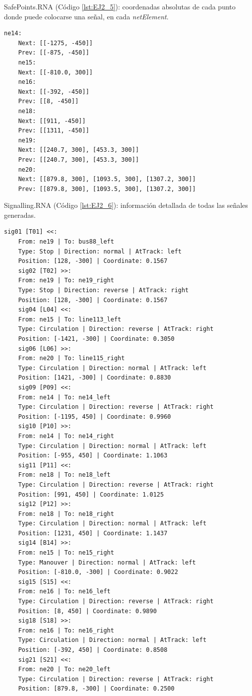 	SafePoints.RNA (Código \ref{lst:EJ2_5}): coordenadas absolutas de cada punto donde puede colocarse una señal, en cada \textit{netElement}.

	\begin{lstlisting}[language = {}, caption = SafePoints.RNA, label = {lst:EJ2_5}]
	ne14:
	Next: [[-1275, -450]]
	Prev: [[-875, -450]]
	ne15:
	Next: [[-810.0, 300]]
	ne16:
	Next: [[-392, -450]]
	Prev: [[8, -450]]
	ne18:
	Next: [[911, -450]]
	Prev: [[1311, -450]]
	ne19:
	Next: [[240.7, 300], [453.3, 300]]
	Prev: [[240.7, 300], [453.3, 300]]
	ne20:
	Next: [[879.8, 300], [1093.5, 300], [1307.2, 300]]
	Prev: [[879.8, 300], [1093.5, 300], [1307.2, 300]]
	\end{lstlisting}

	Signalling.RNA (Código \ref{lst:EJ2_6}): información detallada de todas las señales generadas.

	\begin{lstlisting}[language = {}, caption = Signalling.RNA, label = {lst:EJ2_6}]
	sig01 [T01] <<:
	From: ne19 | To: bus88_left
	Type: Stop | Direction: normal | AtTrack: left 
	Position: [128, -300] | Coordinate: 0.1567
	sig02 [T02] >>:
	From: ne19 | To: ne19_right
	Type: Stop | Direction: reverse | AtTrack: right 
	Position: [128, -300] | Coordinate: 0.1567
	sig04 [L04] <<:
	From: ne15 | To: line113_left
	Type: Circulation | Direction: reverse | AtTrack: right 
	Position: [-1421, -300] | Coordinate: 0.3050
	sig06 [L06] >>:
	From: ne20 | To: line115_right
	Type: Circulation | Direction: normal | AtTrack: left 
	Position: [1421, -300] | Coordinate: 0.8830
	sig09 [P09] <<:
	From: ne14 | To: ne14_left
	Type: Circulation | Direction: reverse | AtTrack: right 
	Position: [-1195, 450] | Coordinate: 0.9960
	sig10 [P10] >>:
	From: ne14 | To: ne14_right
	Type: Circulation | Direction: normal | AtTrack: left 
	Position: [-955, 450] | Coordinate: 1.1063
	sig11 [P11] <<:
	From: ne18 | To: ne18_left
	Type: Circulation | Direction: reverse | AtTrack: right 
	Position: [991, 450] | Coordinate: 1.0125
	sig12 [P12] >>:
	From: ne18 | To: ne18_right
	Type: Circulation | Direction: normal | AtTrack: left 
	Position: [1231, 450] | Coordinate: 1.1437
	sig14 [B14] >>:
	From: ne15 | To: ne15_right
	Type: Manouver | Direction: normal | AtTrack: left 
	Position: [-810.0, -300] | Coordinate: 0.9022
	sig15 [S15] <<:
	From: ne16 | To: ne16_left
	Type: Circulation | Direction: reverse | AtTrack: right 
	Position: [8, 450] | Coordinate: 0.9890
	sig18 [S18] >>:
	From: ne16 | To: ne16_right
	Type: Circulation | Direction: normal | AtTrack: left 
	Position: [-392, 450] | Coordinate: 0.8508
	sig21 [S21] <<:
	From: ne20 | To: ne20_left
	Type: Circulation | Direction: reverse | AtTrack: right 
	Position: [879.8, -300] | Coordinate: 0.2500
	\end{lstlisting}


